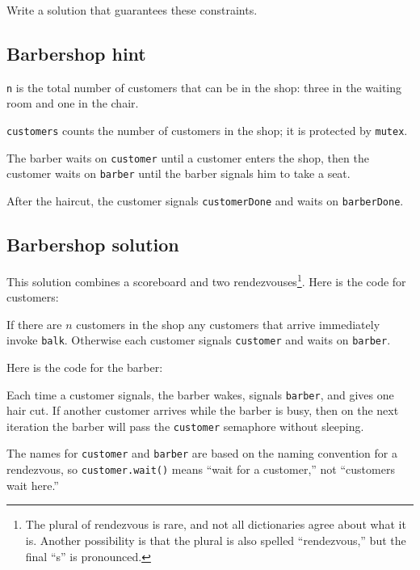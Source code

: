 \documentclass{book}
\newcommand{\clearemptydoublepage}{\newpage\cleardoublepage}
\begin{document}
Write a solution that guarantees these constraints.


\clearemptydoublepage
\subsection{Barbershop hint}



{\tt n} is the total number of customers that can be in the shop:
three in the waiting room and one in the chair.

{\tt customers} counts the number of customers in the shop;
it is protected by {\tt mutex}.

The barber waits on {\tt customer} until a customer enters the
shop, then the customer waits on {\tt barber} until the barber
signals him to take a seat.

After the haircut, the customer signals {\tt customerDone} and
waits on {\tt barberDone}.

\clearemptydoublepage
\subsection{Barbershop solution}

This solution combines a scoreboard and two rendezvouses\footnote{The
  plural of rendezvous is rare, and not all dictionaries agree about
  what it is.  Another possibility is that the plural is also spelled
  ``rendezvous,'' but the final ``s'' is pronounced.}.  Here is the
code for customers:



If there are $n$ customers in the shop any customers that
arrive immediately invoke {\tt balk}.
Otherwise each customer signals {\tt customer} and waits on
{\tt barber}.

Here is the code for the barber:



Each time a customer signals,
the barber wakes, signals {\tt barber}, and gives one
hair cut.  If another customer arrives while the barber
is busy, then on the next iteration the barber will pass
the {\tt customer} semaphore without sleeping.

The names for {\tt customer} and {\tt barber} are based on
the naming convention for a rendezvous, so {\tt customer.wait()}
means ``wait for a customer,'' not ``customers wait here.''
\end{document}
